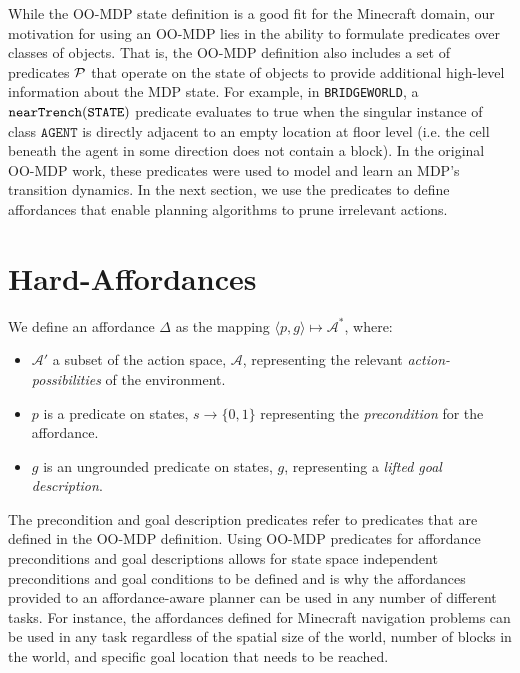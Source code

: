 \documentclass[conference]{IEEEtran}
\begin{document}
While the OO-MDP state definition is a good fit for the Minecraft
domain, our motivation for using an OO-MDP lies in the ability to
formulate predicates over classes of objects. That is, the OO-MDP
definition also includes a set of predicates ${\cal P}$ that operate
on the state of objects to provide additional high-level information
about the MDP state. For example, in \texttt{BRIDGEWORLD}, a ${\tt
  nearTrench}({\tt STATE})$ predicate evaluates to true when the singular
instance of class $\texttt{AGENT}$ is directly adjacent to an empty location
at floor level (i.e. the cell beneath the agent in some direction does not
contain a block). In the original OO-MDP work, these predicates were used
to model and learn an MDP's transition dynamics. In the next section,
we use the predicates to define affordances that enable planning
algorithms to prune irrelevant actions.


\section{Hard-Affordances}
\label{sec:hard-affordances}

We define an affordance $\Delta$ 
as the mapping $\langle p,g\rangle \longmapsto \mathcal{A}^*$,
where:
\begin{itemize}
\item[] $\mathcal{A}'$ a subset of the action space, $\mathcal{A}$, representing the relevant {\it action-possibilities} of the environment.
\item[] $p$ is a predicate on states, $s \longrightarrow \{$0$, 1\}$
  representing the {\em precondition} for the affordance.
\item[] $g$ is an ungrounded predicate on states, $g$, representing a {\it lifted goal description}.
\end{itemize}
The precondition and goal description predicates refer to predicates that are defined in the OO-MDP definition. 
Using OO-MDP predicates for affordance preconditions and goal descriptions 
allows for state space independent preconditions and goal conditions 
to be defined and is why the affordances provided to an
affordance-aware planner can be used in any number of different tasks. For instance, the affordances defined for Minecraft navigation problems can be used in any task regardless of the spatial size of the world, number of blocks in the world, and specific goal location that needs to be reached.
\end{document}
